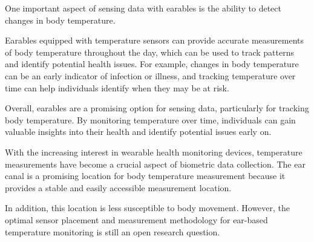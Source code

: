 One important aspect of sensing data with earables is the ability to detect changes in body temperature. 

Earables equipped with temperature sensors can provide accurate measurements of body temperature throughout the day, which can be used to track patterns and identify potential health issues. 
For example, changes in body temperature can be an early indicator of infection or illness, and tracking temperature over time can help individuals identify when they may be at risk.

Overall, earables are a promising option for sensing data, particularly for tracking body temperature. 
By monitoring temperature over time, individuals can gain valuable insights into their health and identify potential issues early on.

With the increasing interest in wearable health monitoring devices, temperature measurements have become a crucial aspect of biometric data collection. The ear canal is a promising location for body temperature measurement because it provides a stable and easily accessible measurement location. %

In addition, this location is less susceptible to body movement. However, the optimal sensor placement and measurement methodology for ear-based temperature monitoring is still an open research question. %


